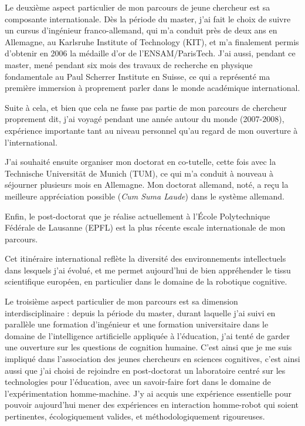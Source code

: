 \documentclass[a4paper]{article}
\begin{document}
Le deuxième aspect particulier de mon parcours de jeune chercheur est sa
composante internationale. Dès la période du master, j'ai fait le choix de
suivre un cursus d'ingénieur franco-allemand, qui m'a conduit près de deux ans
en Allemagne, au Karlsruhe Institute of Technology (KIT), et m'a finalement
permis d'obtenir en 2006 la médaille d'or de l'ENSAM/ParisTech. J'ai aussi,
pendant ce master, mené pendant six mois des travaux de recherche en physique
fondamentale au Paul Scherrer Institute en Suisse, ce qui a représenté ma
première immersion à proprement parler dans le monde académique international.

Suite à cela, et bien que cela ne fasse pas partie de mon parcours de chercheur
proprement dit, j'ai voyagé pendant une année autour du monde (2007-2008),
expérience importante tant au niveau personnel qu'au regard de mon ouverture à
l'international.

J'ai souhaité ensuite organiser mon doctorat en co-tutelle, cette
fois avec la Technische Universität de Munich (TUM), ce qui m'a conduit à
nouveau à séjourner plusieurs mois en Allemagne. Mon doctorat allemand, noté, a
reçu la meilleure appréciation possible (\emph{Cum Suma Laude}) dans le système
allemand.

Enfin, le post-doctorat que je réalise actuellement à l'École Polytechnique
Fédérale de Lausanne (EPFL) est la plus récente escale internationale de mon
parcours.

Cet itinéraire international reflète la diversité des environnements
intellectuels dans lesquels j'ai évolué, et me permet aujourd'hui de bien
appréhender le tissu scientifique européen, en particulier dans le domaine de la
robotique cognitive.

Le troisième aspect particulier de mon parcours est sa dimension
interdisciplinaire : depuis la période du master, durant laquelle j'ai suivi en
parallèle une formation d'ingénieur et une formation universitaire dans le
domaine de l'intelligence artificielle appliquée à l'éducation, j'ai tenté de
garder une ouverture sur les questions de cognition humaine. C'est ainsi que je
me suis impliqué dans l'association des jeunes chercheurs en sciences
cognitives, c'est ainsi aussi que j'ai choisi de rejoindre en post-doctorat un
laboratoire centré sur les technologies pour l'éducation, avec un savoir-faire
fort dans le domaine de l'expérimentation homme-machine. J'y ai acquis une
expérience essentielle pour pouvoir aujourd'hui mener des expériences en
interaction homme-robot qui soient pertinentes, écologiquement valides, et
méthodologiquement rigoureuses.

\printbibliography

\end{document}
